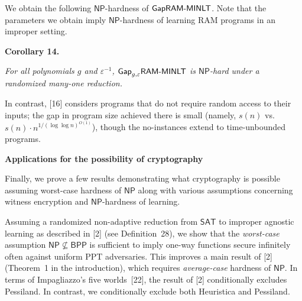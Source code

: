 We obtain the following ${\mathsf{NP}}$-hardness of ${\sf Gap}{\sf RAM}\text{-}{\sf MINLT}$. Note that the parameters we obtain imply ${\mathsf{NP}}$-hardness of learning RAM programs in an improper setting.\par





\par\medskip\noindent\textbf{
\textbf{Corollary 14}\textbf{.}
}\par



\emph{For all polynomials $g$ and $\varepsilon^{-1}$, ${\sf Gap}_{g,\varepsilon}{\sf RAM}\text{-}{\sf MINLT}$ is ${\mathsf{NP}}$-hard under a randomized many-one reduction.}\par






In contrast, [16] considers programs that do not require random access to their inputs; the gap in program size achieved there is small (namely, $s(n)$ vs. $s(n)\cdot n^{1/(\log\log n)^{O(1)}}$), though the no-instances extend to time-unbounded programs.\par





\par\medskip\noindent\textbf{Applications for the possibility of cryptography}\par




Finally, we prove a few results demonstrating what cryptography is possible assuming worst-case hardness of ${\mathsf{NP}}$ along with various assumptions concerning witness encryption and ${\mathsf{NP}}$-hardness of learning.\par




Assuming a randomized non-adaptive reduction from ${\mathsf{SAT}}$ to improper agnostic learning as described in [2] (see Definition 28), we show that the \emph{worst-case} assumption ${\mathsf{NP}}\nsubseteq{\mathsf{BPP}}$ is sufficient to imply one-way functions secure infinitely often against uniform PPT adversaries. This improves a main result of [2] (Theorem 1 in the introduction), which requires \emph{average-case} hardness of ${\mathsf{NP}}$. In terms of Impagliazzo’s five worlds [22], the result of [2] conditionally excludes Pessiland. In contrast, we conditionally exclude both Heuristica and Pessiland.\par



